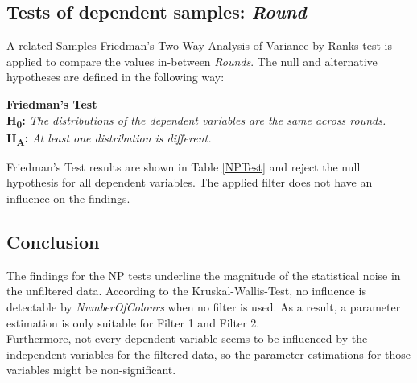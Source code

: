
\subsection{Tests of dependent samples: \textit{Round}}
A related-Samples Friedman's Two-Way Analysis of Variance by Ranks test \citep{Friedman1937} is applied to compare the values in-between \textit{Rounds}. The null and alternative hypotheses are defined in the following way:

\textbf{Friedman's Test} \\ 
\textbf{H\textsubscript{0}:} \textit{The distributions of the dependent variables are the same across rounds.}\\
\textbf{H\textsubscript{A}:} \textit{At least one distribution is different.}

Friedman's Test results are shown in Table \ref{NPTest} and reject the null hypothesis for all dependent variables. The applied filter does not have an influence on the findings.

\subsection{Conclusion}
The findings for the \ac{NP} tests underline the magnitude of the statistical noise in the unfiltered data. According to the Kruskal-Wallis-Test, no influence is detectable by \textit{NumberOfColours} when no filter is used. As a result, a parameter estimation is only suitable for Filter 1 and Filter 2.\\
Furthermore, not every dependent variable seems to be influenced by the independent variables for the filtered data, so the parameter estimations for those variables might be non-significant.
\newpage
